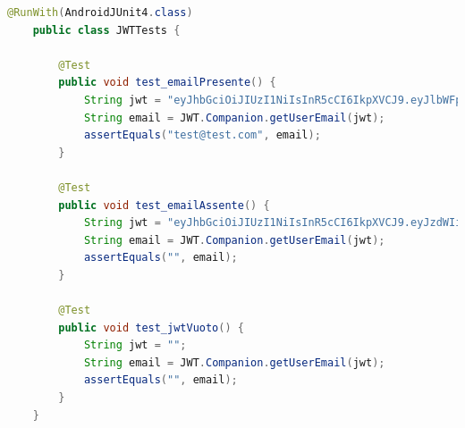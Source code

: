             \begin{lstlisting}[language=Java, caption=JWTTests.java]
    @RunWith(AndroidJUnit4.class)
    public class JWTTests {
    
        @Test
        public void test_emailPresente() {
            String jwt = "eyJhbGciOiJIUzI1NiIsInR5cCI6IkpXVCJ9.eyJlbWFpbCI6InRlc3RAdGVzdC5jb20ifQ.sig";
            String email = JWT.Companion.getUserEmail(jwt);
            assertEquals("test@test.com", email);
        }
    
        @Test
        public void test_emailAssente() {
            String jwt = "eyJhbGciOiJIUzI1NiIsInR5cCI6IkpXVCJ9.eyJzdWIiOiIxMjM0NTY3ODkwIn0.sig";
            String email = JWT.Companion.getUserEmail(jwt);
            assertEquals("", email);
        }
    
        @Test
        public void test_jwtVuoto() {
            String jwt = "";
            String email = JWT.Companion.getUserEmail(jwt);
            assertEquals("", email);
        }
    }
            \end{lstlisting}